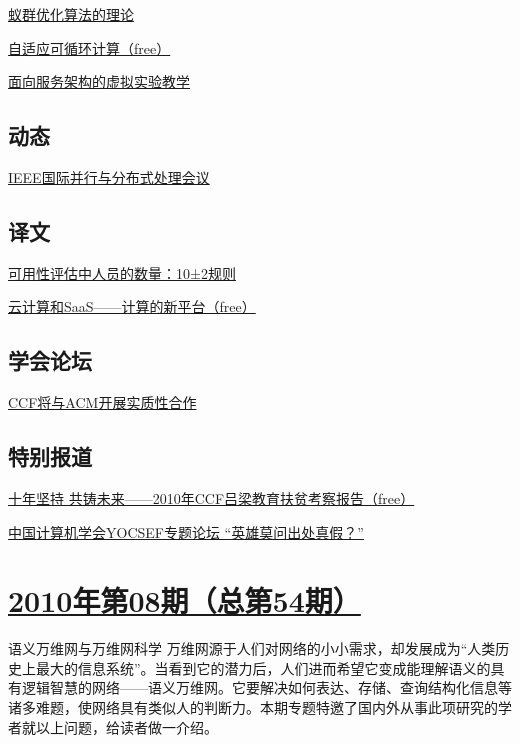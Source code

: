 \documentclass[a4paper]{article}
\begin{document}
\href{http://history.ccf.org.cn/resources/1190201776262/2010/09/15/201009-10.pdf}{蚁群优化算法的理论}

\href{http://history.ccf.org.cn/resources/1190201776262/2010/09/15/201009-11-free.pdf}{自适应可循环计算（free）}

\href{http://history.ccf.org.cn/resources/1190201776262/2010/09/15/201009-12.pdf}{面向服务架构的虚拟实验教学}

\subsection{动态}
\href{http://history.ccf.org.cn/resources/1190201776262/2010/09/15/201009-13.pdf}{IEEE国际并行与分布式处理会议}

\subsection{译文}
\href{http://history.ccf.org.cn/resources/1190201776262/2010/09/15/201009-14.pdf}{可用性评估中人员的数量：10±2规则}

\href{http://history.ccf.org.cn/resources/1190201776262/2010/09/15/201009-15-free.pdf}{云计算和SaaS——计算的新平台（free）}

\subsection{学会论坛}
\href{http://history.ccf.org.cn/resources/1190201776262/2010/09/15/201009-18.pdf}{CCF将与ACM开展实质性合作}

\subsection{特别报道}
\href{http://history.ccf.org.cn/resources/1190201776262/2010/09/15/201009-16-free.pdf}{十年坚持  共铸未来——2010年CCF吕梁教育扶贫考察报告（free）}

\href{http://history.ccf.org.cn/resources/1190201776262/2010/09/15/201009-17.pdf}{中国计算机学会YOCSEF专题论坛 “英雄莫问出处真假？”}


\section{\href{http://history.ccf.org.cn/sites/ccf/jsjtbbd.jsp?contentId=2562834412265}{\textbf{2010年第08期（总第54期）}}}
语义万维网与万维网科学 万维网源于人们对网络的小小需求，却发展成为“人类历史上最大的信息系统”。当看到它的潜力后，人们进而希望它变成能理解语义的具有逻辑智慧的网络——语义万维网。它要解决如何表达、存储、查询结构化信息等诸多难题，使网络具有类似人的判断力。本期专题特邀了国内外从事此项研究的学者就以上问题，给读者做一介绍。
\end{document}
